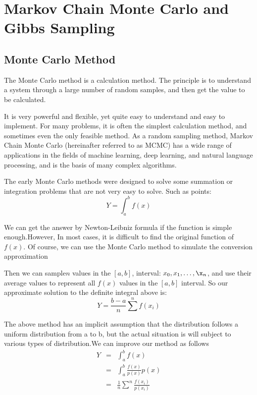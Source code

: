 \section{Markov Chain Monte Carlo and Gibbs Sampling}\label{bases}

\subsection{Monte Carlo Method}
The Monte Carlo method is a calculation method. The principle is to understand a system through a large number of random samples, and then get the value to be calculated.

It is very powerful and flexible, yet quite easy to understand and easy to implement. For many problems, it is often the simplest calculation method, and sometimes even the only feasible method.
As a random sampling method, Markov Chain Monte Carlo (hereinafter referred to as MCMC) has a wide range of applications in the fields of machine learning, deep learning, and natural language processing, and is the basis of many complex algorithms.

The early Monte Carlo methods were designed to solve some summation or integration problems that are not very easy to solve. Such as points:
\[
Y = \int_a^b f(x)

\]

We can get the answer by Newton-Leibniz formula if the function is simple enough.However,
In most cases, it is difficult to find the original function of $f(x)$. Of course, we can use the Monte Carlo method to simulate the conversion approximation

Then we can sample$n$ values ​​in the $[a,b]$, interval: $x_0,x_1,\dots,\x_n$, and use their average values ​​to represent all $f(x)$ values ​​in the $[a,b]$ interval. So our approximate solution to the definite integral above is:
\[
  Y = \frac{b-a}{n}\sum^n f(x_i)
\]

The above method has an implicit assumption that the distribution follows a uniform distribution from a to b, but the actual situation is will subject to  various types of distribution.We can improve our method as follows
\begin{eqnarray*}
Y &=& \int_a^b f(x) \\
  &=& \int_a^b \frac{f(x)}{p(x)}p(x) \\
  &=& \frac{1}{n} \sum^n \frac{f(x_i)}{p(x_i)}\\
\end{eqnarray*}

